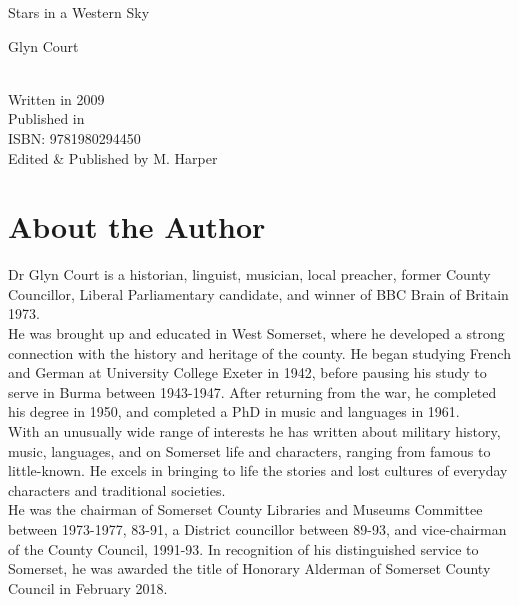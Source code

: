 \documentclass[11pt]{book}
\newcommand*{\plogo}{\fbox{\textbf{MH}}} %
\newcommand*{\titleBC}{\begingroup %
\centering %
\huge{Stars in a Western Sky} %

\vfill %
\Large{Glyn Court} %

\vfill %
\normalsize
\plogo\\[0.5\baselineskip]
Written in 2009\\
Published in \the\year \\%
\centering
ISBN: 9781980294450\\
Edited \& Published by M. Harper \\

\endgroup}
\begin{document}
\frontmatter

\thispagestyle{empty}  %
\titleBC 

\newpage

\chapter*{About the Author}

Dr Glyn Court is a historian, linguist, musician, local preacher, former County Councillor, Liberal Parliamentary candidate, and winner of BBC Brain of Britain 1973.\\

He was brought up and educated in West Somerset, where he developed a strong connection with the history and heritage of the county.  He began studying French and German at University College Exeter in 1942, before pausing his study to serve in Burma between 1943-1947. After returning from the war, he completed his degree in 1950, and completed a PhD in music and languages in 1961. \\

With an unusually wide range of interests he has written about military history, music, languages, and on Somerset life and characters, ranging from famous to little-known.  He excels in bringing to life the stories and lost cultures of everyday characters and traditional societies.\\

He was the chairman of Somerset County Libraries and Museums Committee between 1973-1977, 83-91, a District councillor between 89-93, and vice-chairman of the County Council, 1991-93. In recognition of his distinguished service to Somerset, he was awarded the title of Honorary Alderman of Somerset County Council in February 2018.

\newpage

\pagebreak
\hspace{0pt}
\vfill
\end{document}
